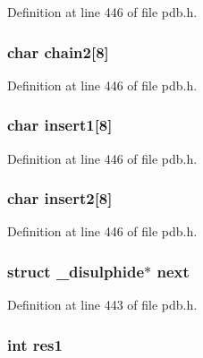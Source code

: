 Definition at line 446 of file pdb.\-h.

\hypertarget{struct__disulphide_a0b12586562770f31367fa9a7af4a1b09}{
\subsubsection[{chain2}]{\setlength{\rightskip}{0pt plus 5cm}char chain2\mbox{[}8\mbox{]}}}\label{struct__disulphide_a0b12586562770f31367fa9a7af4a1b09}


Definition at line 446 of file pdb.\-h.

\hypertarget{struct__disulphide_a40813cb2e390608ac9828d857950ffd1}{
\subsubsection[{insert1}]{\setlength{\rightskip}{0pt plus 5cm}char insert1\mbox{[}8\mbox{]}}}\label{struct__disulphide_a40813cb2e390608ac9828d857950ffd1}


Definition at line 446 of file pdb.\-h.

\hypertarget{struct__disulphide_aa36703384eb0aaa384cc934ddfee1882}{
\subsubsection[{insert2}]{\setlength{\rightskip}{0pt plus 5cm}char insert2\mbox{[}8\mbox{]}}}\label{struct__disulphide_aa36703384eb0aaa384cc934ddfee1882}


Definition at line 446 of file pdb.\-h.

\hypertarget{struct__disulphide_a8cd57ab6b7776ee66ce1877be655e689}{
\subsubsection[{next}]{\setlength{\rightskip}{0pt plus 5cm}struct {\bf \-\_\-disulphide}$\ast$ next}}\label{struct__disulphide_a8cd57ab6b7776ee66ce1877be655e689}


Definition at line 443 of file pdb.\-h.

\hypertarget{struct__disulphide_ab0c79f65dfbf2f2f2d7e108f73fe6f18}{
\subsubsection[{res1}]{\setlength{\rightskip}{0pt plus 5cm}int res1}}\label{struct__disulphide_ab0c79f65dfbf2f2f2d7e108f73fe6f18}


